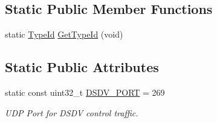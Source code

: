 \subsection*{Static Public Member Functions}
\begin{DoxyCompactItemize}
\item 
static \hyperlink{classns3_1_1TypeId}{Type\+Id} \hyperlink{classns3_1_1dsdv_1_1RoutingProtocol_a94877c474548735fa3764b89a86db709}{Get\+Type\+Id} (void)
\end{DoxyCompactItemize}
\subsection*{Static Public Attributes}
\begin{DoxyCompactItemize}
\item 
static const uint32\+\_\+t \hyperlink{classns3_1_1dsdv_1_1RoutingProtocol_a14b063286a3c34efb9537f6456af3271}{D\+S\+D\+V\+\_\+\+P\+O\+RT} = 269
\begin{DoxyCompactList}\small\item\em U\+DP Port for D\+S\+DV control traffic. \end{DoxyCompactList}\end{DoxyCompactItemize}
